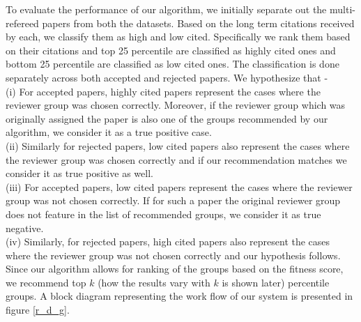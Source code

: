 To evaluate the performance of our algorithm, we initially separate out the multi-refereed papers from both the datasets. Based on the long term citations received by each, 
we classify them as high and low cited. Specifically we rank them based on their citations and top 25 percentile are classified as highly cited ones and bottom 25 percentile 
are classified as low cited ones. The classification is done separately across both accepted and rejected papers. We hypothesize that - \\
(i) For accepted papers, highly cited papers represent the cases where the reviewer group was chosen correctly. Moreover, if the reviewer group which was originally assigned 
the paper is also one of the groups recommended by our algorithm, we consider it as a true positive case.\\
(ii) Similarly for rejected papers, low cited papers also represent the cases where the reviewer group was chosen correctly and if our recommendation matches we consider 
it as true positive as well.\\
(iii) For accepted papers, low cited papers represent the cases where the reviewer group was not chosen correctly. If for such a paper the original reviewer group does not feature in the 
list of recommended groups, we consider it as true negative. \\ 
(iv) Similarly, for rejected papers, high cited papers also represent the cases where the reviewer group was not chosen correctly and our hypothesis follows. \\
Since our algorithm allows for ranking of the groups based on the fitness score, we recommend top $k$ (how the results vary with $k$ is shown later) percentile groups. A block diagram representing the work flow of our system is presented in figure \ref{r_d_g}.


